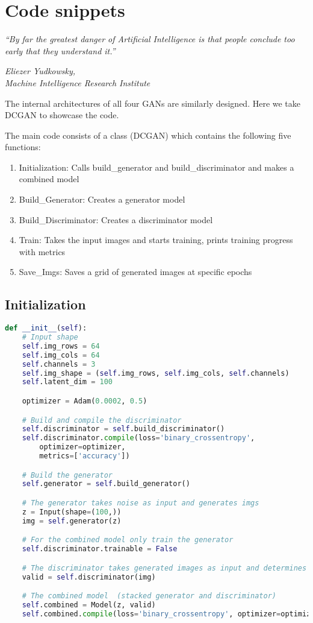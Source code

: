 {\chapter{Code snippets}\label{ch:scope}}
\epigraph{\textit{\normalsize “By far the greatest danger of Artificial Intelligence is that people conclude too early that they understand it.”}}{\textit{ \normalsize Eliezer Yudkowsky,\\ Machine Intelligence Research Institute}}

The internal architectures of all four GANs are similarly designed. Here we take DCGAN to showcase the code.

\par\bigskip 
The main code consists of a class (DCGAN) which contains the following five functions:
\par\bigskip

\begin{enumerate}
    \item Initialization: Calls build\_generator and build\_discriminator and makes a combined model
    \item Build\_Generator: Creates a generator model
    \item Build\_Discriminator: Creates a discriminator model
    \item Train: Takes the input images and starts training, prints training progress with metrics
    \item Save\_Imgs: Saves a grid of generated images at specific epochs
\end{enumerate}

\section{Initialization} %
\label{sec:initialization}
\begin{lstlisting}[basicstyle=\scriptsize,language=Python]
def __init__(self):
    # Input shape
    self.img_rows = 64
    self.img_cols = 64
    self.channels = 3
    self.img_shape = (self.img_rows, self.img_cols, self.channels)
    self.latent_dim = 100

    optimizer = Adam(0.0002, 0.5)

    # Build and compile the discriminator
    self.discriminator = self.build_discriminator()
    self.discriminator.compile(loss='binary_crossentropy',
        optimizer=optimizer,
        metrics=['accuracy'])

    # Build the generator
    self.generator = self.build_generator()

    # The generator takes noise as input and generates imgs
    z = Input(shape=(100,))
    img = self.generator(z)

    # For the combined model only train the generator
    self.discriminator.trainable = False

    # The discriminator takes generated images as input and determines validity
    valid = self.discriminator(img)

    # The combined model  (stacked generator and discriminator)
    self.combined = Model(z, valid)
    self.combined.compile(loss='binary_crossentropy', optimizer=optimizer)
\end{lstlisting}

